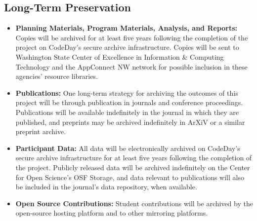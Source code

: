 \subsection{Long-Term Preservation}
\begin{itemize}
    \item \textbf{Planning Materials, Program Materials, Analysis, and Reports:} Copies will be archived for at least five years following the completion of the project on CodeDay's secure archive infrastructure. Copies will be sent to Washington State Center of Excellence in Information \& Computing Technology and the AppConnect NW network for possible inclusion in these agencies’ resource libraries.

    \item \textbf{Publications:} One long-term strategy for archiving the outcomes of this project will be through publication in journals and conference proceedings. Publications will be available indefinitely in the journal in which they are published, and preprints may be archived indefinitely in ArXiV or a similar preprint archive.

    \item \textbf{Participant Data:} All data will be electronically archived on CodeDay's secure archive infrastructure for at least five years following the completion of the project. Publicly released data will be archived indefinitely on the Center for Open Science's OSF Storage, and data relevant to publications will also be included in the journal's data repository, when available.

    \item \textbf{Open Source Contributions:} Student contributions will be archived by the open-source hosting platform and to other mirroring platforms.
\end{itemize}